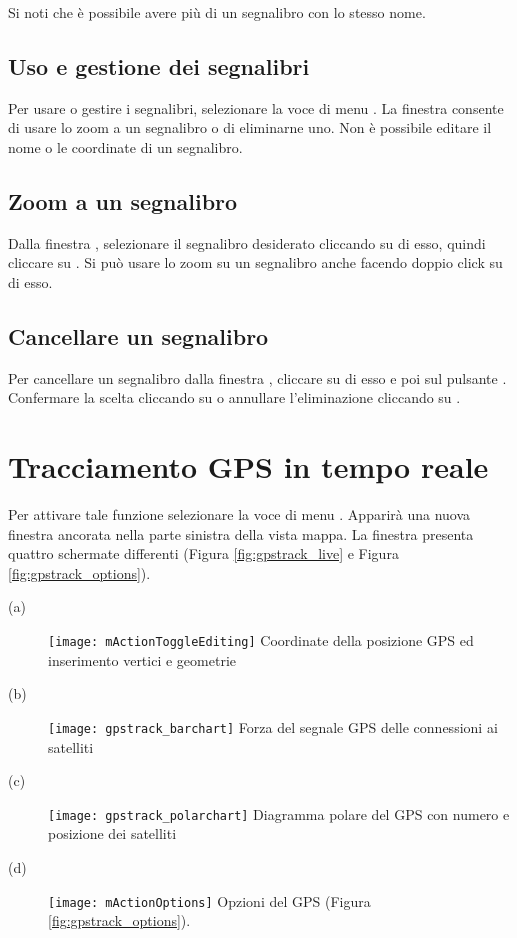 Si noti che è possibile avere più di un segnalibro con lo stesso nome.

\subsection{Uso e gestione dei segnalibri}
Per usare o gestire i segnalibri, selezionare la voce di menu
 \arrow {}.
La finestra  consente di usare lo zoom a un
segnalibro o di eliminarne uno.
Non è possibile editare il nome o le coordinate di un segnalibro.

\subsection{Zoom a un segnalibro}
Dalla finestra , selezionare il
segnalibro desiderato cliccando su di esso, quindi cliccare su .
Si può usare lo zoom su un segnalibro anche facendo doppio click su di esso.

\subsection{Cancellare un segnalibro}
Per cancellare un segnalibro dalla finestra ,
cliccare su di esso e poi sul pulsante .
Confermare la scelta cliccando su  o annullare l'eliminazione
cliccando su .

\section{Tracciamento GPS in tempo reale}\label{sec:gpstracking}

Per attivare tale funzione selezionare la voce di menu  \arrow {}.
Apparirà una nuova finestra ancorata nella parte sinistra della vista mappa. La finestra presenta quattro schermate differenti
(Figura \ref{fig:gpstrack_live} e Figura \ref{fig:gpstrack_options}).

\begin{description}
 \item[(a)] \texttt{[image: mActionToggleEditing]}
Coordinate della posizione GPS ed inserimento vertici e geometrie
 \item[(b)] \texttt{[image: gpstrack\_barchart]}
Forza del segnale GPS delle connessioni ai satelliti
 \item[(c)] \texttt{[image: gpstrack\_polarchart]}
Diagramma polare del GPS con numero e posizione dei satelliti
 \item[(d)] \texttt{[image: mActionOptions]}
Opzioni del GPS (Figura \ref{fig:gpstrack_options}).
\end{description}

